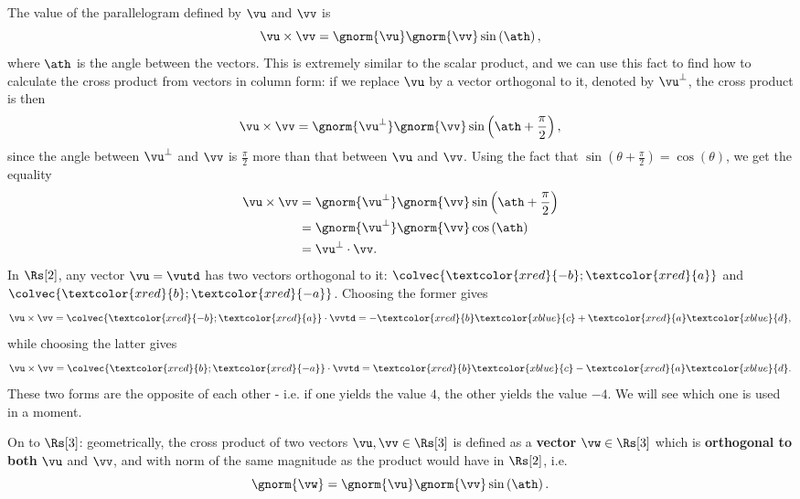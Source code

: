 The value of the parallelogram defined by $\vu$ and $\vv$ is
\begin{equation}
	\vu\times\vv = \gnorm{\vu}\gnorm{\vv}\sin \left( \ath \right),
	\label{eq:cross_product_geometric_area}
\end{equation}
where $\ath$ is the angle between the vectors. This is extremely similar to the scalar product, and we can use this fact to find how to calculate the cross product from vectors in column form: if we replace $\vu$ by a vector orthogonal to it, denoted by $\vu^{\perp}$, the cross product is then
\begin{equation}
	\vu\times\vv = \gnorm{\vu^{\perp}}\gnorm{\vv}\sin \left( \ath+\frac{\pi}{2} \right),
	\label{eq:cross_product_to_dot_product_part1}
\end{equation}
since the angle between $\vu^{\perp}$ and $\vv$ is $\frac{\pi}{2}$ more than that between $\vu$ and $\vv$. Using the fact that $\sin \left( \theta+\frac{\pi}{2} \right) = \cos \left( \theta \right)$, we get the equality
\begin{align}
	\vu\times\vv &= \gnorm{\vu^{\perp}}\gnorm{\vv}\sin \left( \ath+\frac{\pi}{2} \right)\nonumber\\
				 &= \gnorm{\vu^{\perp}}\gnorm{\vv}\cos \left( \ath \right)\nonumber\\
				 &= \vu^{\perp}\cdot\vv.
	\label{eq:cross_product_to_dot_product_part2}
\end{align}
In $\Rs[2]$, any vector $\vu=\vutd$ has two vectors orthogonal to it: $\colvec{\textcolor{xred}{-b};\textcolor{xred}{a}}$ and $\colvec{\textcolor{xred}{b};\textcolor{xred}{-a}}$. Choosing the former gives
\begin{equation}
	\vu\times\vv = \colvec{\textcolor{xred}{-b};\textcolor{xred}{a}} \cdot \vvtd = -\textcolor{xred}{b}\textcolor{xblue}{c}+\textcolor{xred}{a}\textcolor{xblue}{d},
	\label{eq:cross_product_2d_algebraic}
\end{equation}
while choosing the latter gives
\begin{equation}
	\vu\times\vv = \colvec{\textcolor{xred}{b};\textcolor{xred}{-a}} \cdot \vvtd = \textcolor{xred}{b}\textcolor{xblue}{c}-\textcolor{xred}{a}\textcolor{xblue}{d}.
	\label{eq:}
\end{equation}
These two forms are the opposite of each other - i.e. if one yields the value $4$, the other yields the value $-4$. We will see which one is used in a moment.

On to $\Rs[3]$: geometrically, the cross product of two vectors $\vu,\vv\in\Rs[3]$ is defined as a \textbf{vector} $\vw\in\Rs[3]$ which is \textbf{orthogonal to both} $\vu$ and $\vv$, and with norm of the same magnitude as the product would have in $\Rs[2]$, i.e.
\begin{equation}
	\gnorm{\vw} = \gnorm{\vu}\gnorm{\vv}\sin\left(\ath\right).
	\label{eq:cross product geometry}
\end{equation}

